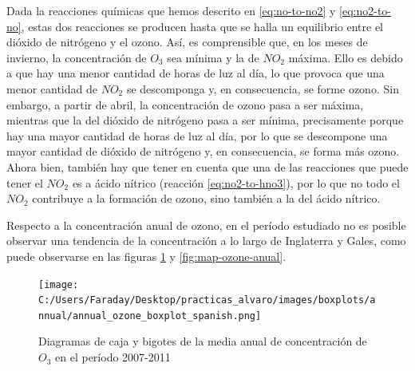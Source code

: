 \documentclass[12pt]{article}
\begin{document}
Dada la reacciones químicas que hemos descrito en \ref{eq:no-to-no2} y \ref{eq:no2-to-no}, estas dos reacciones se producen hasta que se halla un equilibrio entre el dióxido de nitrógeno y el ozono. Así, es comprensible que, en los meses de invierno, la concentración de $O_{3}$ sea mínima y la de $NO_{2}$ máxima. Ello es debido a que hay una menor cantidad de horas de luz al día, lo que provoca que una menor cantidad de $NO_{2}$ se descomponga y, en consecuencia, se forme ozono. Sin embargo, a partir de abril, la concentración de ozono pasa a ser máxima, mientras que la del dióxido de nitrógeno pasa a ser mínima, precisamente porque hay una mayor cantidad de horas de luz al día, por lo que se descompone una mayor cantidad de dióxido de nitrógeno y, en consecuencia, se forma más ozono. Ahora bien, también hay que tener en cuenta que una de las reacciones que puede tener el $NO_{2}$ es a ácido nítrico (reacción \ref{eq:no2-to-hno3}), por lo que no todo el $NO_{2}$ contribuye a la formación de ozono, sino también a la del ácido nítrico.

Respecto a la concentración anual de ozono, en el período estudiado no es posible observar una tendencia de la concentración a lo largo de Inglaterra y Gales, como puede observarse en las figuras \ref{fig:box_ozone_annual} y \ref{fig:map-ozone-anual}.

\begin{figure}[H]
\centering
\texttt{[image: C:/Users/Faraday/Desktop/practicas\_alvaro/images/boxplots/annual/annual\_ozone\_boxplot\_spanish.png]}
\caption{Diagramas de caja y bigotes de la media anual de concentración de $O_{3}$ en el período 2007-2011}
\label{fig:box_ozone_annual}
\end{figure}
\end{document}
